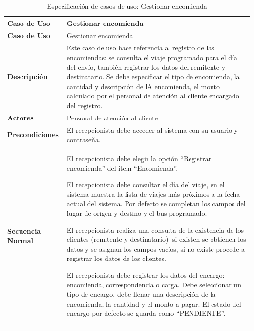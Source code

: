 	\begin{longtable}{m{4cm} m{10.5cm}}
		\caption[Especificación de casos de uso: Gestionar encomienda]{\newline Especificación de casos de uso: Gestionar encomienda} \label{tab:tabla3_8}\\
		\toprule
		\textbf{Caso de Uso} & Gestionar encomienda \\
		\midrule
		\endfirsthead
		
		\toprule
		\textbf{Caso de Uso} & Gestionar encomienda \\
		\endhead
		
		
		\bottomrule
		\endlastfoot
		
		\textbf{Descripción} & Este caso de uso hace referencia al registro de las encomiendas: se consulta el viaje programado para el día del envío, también registrar los datos del remitente y destinatario. Se debe especificar el tipo de encomienda, la cantidad y descripción de lA encomienda, el monto calculado por el personal de atención al cliente encargado del registro. \\ \hline
		\textbf{Actores} & Personal de atención al cliente \\ \hline
		\textbf{Precondiciones} & El recepcionista debe acceder al sistema con su usuario y contraseña. \\ \hline
		\textbf{Secuencia Normal} & 
		El recepcionista debe elegir la opción “Registrar encomienda” del ítem “Encomienda”.
		
		El recepcionista debe consultar el día del viaje, en el sistema muestra la lista de viajes más próximos a la fecha actual del sistema. Por defecto se completan los campos
		del lugar de origen y destino y el bus programado.
		
		El recepcionista realiza una consulta de la existencia de los clientes (remitente y destinatario); si existen se obtienen los datos y se asignan los campos vacíos, si no existe procede a registrar los datos de los clientes.
		
		El recepcionista debe registrar los datos del encargo: encomienda, correspondencia o carga. Debe seleccionar un tipo de encargo, debe llenar una descripción de la encomienda, la cantidad y el monto a pagar. El estado del encargo por defecto se guarda como “PENDIENTE”.
		

\end{longtable}
